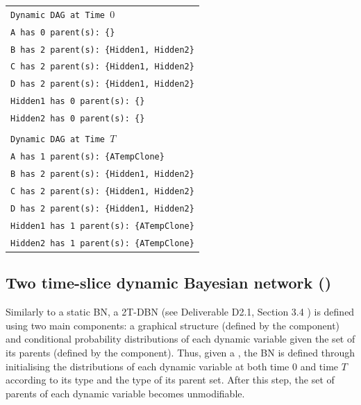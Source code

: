 \vspace{-0.1in}
\begin{table}[H]
\small{\begin{tabular}{l} \\

\texttt{Dynamic DAG at Time $0$}\\
\texttt{A has 0 parent(s): \{\}}\\
\texttt{B has 2 parent(s): \{Hidden1, Hidden2\}}\\
\texttt{C has 2 parent(s): \{Hidden1, Hidden2\}}\\
\texttt{D has 2 parent(s): \{Hidden1, Hidden2\}}\\
\texttt{Hidden1 has 0 parent(s): \{\}}\\
\texttt{Hidden2 has 0 parent(s): \{\}}\\\\

\texttt{Dynamic DAG at Time $T$}\\
\texttt{A has 1 parent(s): \{ATempClone\}}\\
\texttt{B has 2 parent(s): \{Hidden1, Hidden2\}}\\
\texttt{C has 2 parent(s): \{Hidden1, Hidden2\}}\\
\texttt{D has 2 parent(s): \{Hidden1, Hidden2\}}\\
\texttt{Hidden1 has 1 parent(s): \{ATempClone\}}\\
\texttt{Hidden2 has 1 parent(s): \{ATempClone\}}\\

\end{tabular}}
\end{table}


\subsection{Two time-slice dynamic Bayesian network ()}

Similarly to a static BN, a 2T-DBN (see Deliverable D2.1, Section 3.4 \cite{Deliverable2.1}) is defined using two main components: a graphical structure (defined by the  component) and conditional probability distributions of each dynamic variable given the set of its parents (defined by the  component). Thus, given a , the BN is defined through initialising the distributions of each dynamic variable at both time $0$ and time $T$ according to its type and the type of its parent set. After this step, the set of parents of each dynamic variable becomes unmodifiable.

